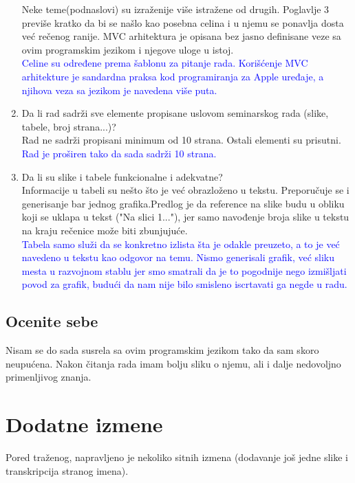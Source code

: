\documentclass[a4paper]{report}
\newcommand{\odgovor}[1]{\textcolor{blue}{#1}}
\begin{document}
\begin{enumerate}
Neke teme(podnaslovi) su izraženije više istražene od drugih. Poglavlje 3 previše kratko da bi se našlo kao posebna celina i u njemu se ponavlja dosta već rečenog ranije. MVC arhitektura je opisana bez jasno definisane veze sa ovim programskim jezikom i njegove uloge u istoj. \\
\odgovor{Celine su određene prema šablonu za pitanje rada. Korišćenje MVC arhitekture je sandardna praksa kod programiranja za Apple uređaje, a njihova veza sa jezikom je navedena više puta.}
\item Da li rad sadrži sve elemente propisane uslovom seminarskog rada (slike, tabele, broj strana...)?\\
Rad ne sadrži propisani minimum od 10 strana. Ostali elementi su prisutni. \\
\odgovor{Rad je proširen tako da sada sadrži 10 strana.}
\item Da li su slike i tabele funkcionalne i adekvatne?\\
Informacije u tabeli su nešto što je već obrazloženo u tekstu. Preporučuje se i generisanje bar jednog grafika.Predlog je da reference na slike budu u obliku koji se uklapa u tekst ("Na slici 1..."), jer samo navođenje broja slike u tekstu na kraju rečenice može biti zbunjujuće. \\
\odgovor{Tabela samo služi da se konkretno izlista šta je odakle preuzeto, a to je već navedeno u tekstu kao odgovor na temu. Nismo generisali grafik, već sliku mesta u razvojnom stablu jer smo smatrali da je to pogodnije nego izmišljati povod za grafik, budući da nam nije bilo smisleno iscrtavati ga negde u radu.}

\end{enumerate}

\section{Ocenite sebe}
Nisam se do sada susrela sa ovim programskim jezikom tako da sam skoro neupućena. Nakon čitanja rada imam bolju sliku o njemu, ali i dalje nedovoljno primenljivog znanja.


\chapter{Dodatne izmene}
Pored traženog, napravljeno je nekoliko sitnih izmena (dodavanje još jedne slike i transkripcija stranog imena).
\end{document}
